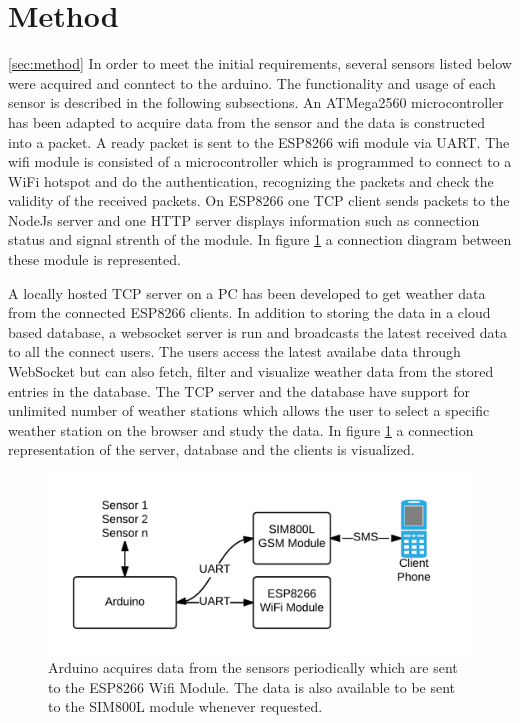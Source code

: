 \section{Method}
\ref{sec:method}
In order to meet the initial requirements, several sensors listed below were acquired and conntect to the arduino.
The functionality and usage of each sensor is described in the following subsections. An ATMega2560 microcontroller
has been adapted to acquire data from the sensor and the data is constructed into a packet. A ready packet is sent to the
ESP8266 wifi module via UART. The wifi module is consisted of a microcontroller which is programmed to connect to a WiFi hotspot and
do the authentication, recognizing the packets and check the validity of the received packets. On ESP8266 one TCP client sends packets to the NodeJs server
and one HTTP server displays information such as connection status and signal strenth of the module. In figure \ref{fig:arduino} a connection diagram
between these module is represented.

A locally hosted TCP server on a PC has been developed to get weather data from the connected ESP8266 clients. In addition to
storing the data in a cloud based database, a websocket server is run and broadcasts the latest received data to all the connect users.
The users access the latest availabe data through WebSocket but can also fetch, filter and visualize weather data from the stored entries in the database.
The TCP server and the database have support for unlimited number of weather stations which allows the user to select a specific weather station on the browser and
study the data. In figure \ref{fig:arduino} a connection representation of the server, database and the clients is visualized.


\begin{figure}[p]
    \centering
    \includegraphics[width=0.8\linewidth]{arduino}
    \caption{Arduino acquires data from the sensors periodically which are sent to the ESP8266 Wifi Module.
      The data is also available to be sent to the SIM800L module whenever requested.}
    \label{fig:arduino}
\end{figure}

